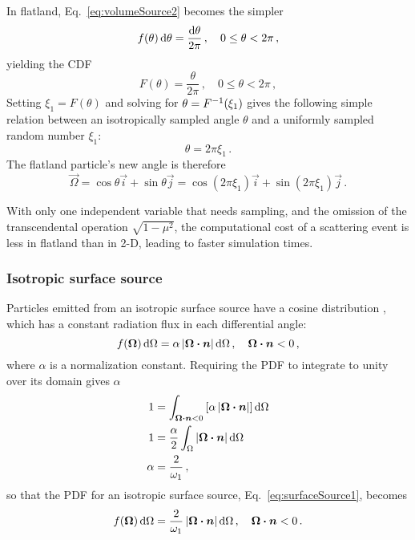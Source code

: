 In flatland, Eq.~\eqref{eq:volumeSource2} becomes the simpler
\begin{equation*}
  f(\theta) \mathop{}\!\mathrm{d}\theta = \frac{\mathop{}\!\mathrm{d}\theta}{2\pi} \,,
  \quad 0 \le \theta < 2\pi\,,
\end{equation*}
yielding the CDF
\begin{equation}\label{eq:volumeSourceFlatland}
  F(\theta) = \frac{\theta}{2\pi}\,,
  \quad 0 \le \theta < 2\pi\,,
\end{equation}
Setting $\xi_1 = F(\theta)$ and solving for $\theta = F^{-1}(\xi_1)$ gives the
following simple relation between an isotropically sampled angle $\theta$ and a
uniformly sampled random number $\xi_1$:
\begin{equation*}
  \theta = 2\pi \xi_1\,.
\end{equation*}
The flatland particle's new angle is therefore
\begin{equation*}
  \vec{\Omega} = \cos \theta \vec{i} + \sin \theta \vec{j}
  = \cos(2\pi\xi_1) \vec{i} + \sin(2\pi\xi_1) \vec{j}\,.
\end{equation*}

With only one independent variable that needs sampling, and the omission of
the transcendental operation $\sqrt{1-\mu^2}$, the computational cost of a
scattering event is less in flatland than in 2-D, leading to
faster simulation times.

\subsubsection{Isotropic surface source}\label{sec:isoSurface}
Particles emitted from an isotropic surface source have a cosine distribution
\cite{Gre2002}, which has a constant radiation flux in each differential
angle:
\begin{equation}\label{eq:surfaceSource1}
  f(\bm{\Omega}) \mathop{}\!\mathrm{d} \Omega = \alpha \left| \bm{\Omega}\bm{\cdot} \bm{n} \right| \mathop{}\!\mathrm{d} \Omega \,,
\quad \bm{\Omega}\bm{\cdot} \bm{n} < 0 \,,
\end{equation}
where $\alpha$ is a normalization constant.
Requiring the PDF to integrate to unity over its domain gives $\alpha$
\begin{align*}
  1 &= \int_{\bm{\Omega}\bm{\cdot} \bm{n} < 0} \left[ \alpha \left| \bm{\Omega}\bm{\cdot}
  \bm{n} \right| \right] \mathop{}\!\mathrm{d}\Omega
  \\
  1 &=\frac{\alpha}{2} \int_{\Omega} \left| \bm{\Omega}\bm{\cdot} \bm{n} \right| \mathop{}\!\mathrm{d}\Omega
  \\
  \alpha &= \frac{2}{\omega_1}\,,
\end{align*}
so that the PDF for an isotropic surface source,
Eq.~\eqref{eq:surfaceSource1}, becomes
\begin{equation}\label{eq:surfaceSource2}
  f(\bm{\Omega}) \mathop{}\!\mathrm{d} \Omega = \frac{2}{\omega_1} \left| \bm{\Omega}\bm{\cdot} \bm{n} \right| \mathop{}\!\mathrm{d} \Omega \,,
\quad \bm{\Omega}\bm{\cdot} \bm{n} < 0 \,.
\end{equation}

